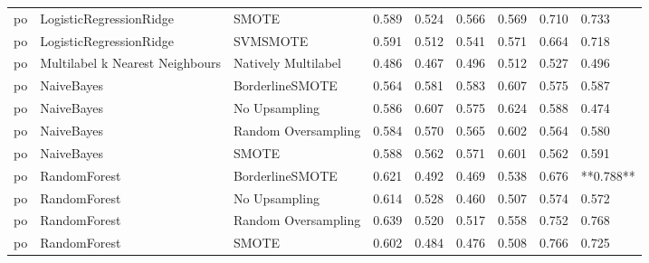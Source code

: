 \begin{tabular}{lllllllll}
      po &         LogisticRegressionRidge &                         SMOTE & 0.589 &                     0.524 &                 0.566 &                  0.569 &                                   0.710 &     0.733 \\
      po &         LogisticRegressionRidge &                      SVMSMOTE & 0.591 &                     0.512 &                 0.541 &                  0.571 &                                   0.664 &     0.718 \\
      po & Multilabel k Nearest Neighbours &           Natively Multilabel & 0.486 &                     0.467 &                 0.496 &                  0.512 &                                   0.527 &     0.496 \\
      po &                      NaiveBayes &               BorderlineSMOTE & 0.564 &                     0.581 &                 0.583 &                  0.607 &                                   0.575 &     0.587 \\
      po &                      NaiveBayes &                 No Upsampling & 0.586 &                     0.607 &                 0.575 &                  0.624 &                                   0.588 &     0.474 \\
      po &                      NaiveBayes &           Random Oversampling & 0.584 &                     0.570 &                 0.565 &                  0.602 &                                   0.564 &     0.580 \\
      po &                      NaiveBayes &                         SMOTE & 0.588 &                     0.562 &                 0.571 &                  0.601 &                                   0.562 &     0.591 \\
      po &                    RandomForest &               BorderlineSMOTE & 0.621 &                     0.492 &                 0.469 &                  0.538 &                                   0.676 & **0.788** \\
      po &                    RandomForest &                 No Upsampling & 0.614 &                     0.528 &                 0.460 &                  0.507 &                                   0.574 &     0.572 \\
      po &                    RandomForest &           Random Oversampling & 0.639 &                     0.520 &                 0.517 &                  0.558 &                                   0.752 &     0.768 \\
      po &                    RandomForest &                         SMOTE & 0.602 &                     0.484 &                 0.476 &                  0.508 &                                   0.766 &     0.725 \\

\end{tabular}
